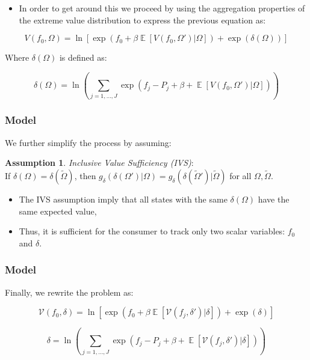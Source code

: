 \documentclass{beamer}
\theoremstyle{definition}
\newtheorem{assump}{Assumption}
\begin{document}
\begin{frame}
  \begin{itemize}
    \item In order to get around this we proceed by using the aggregation
      properties of the extreme value distribution to express the previous
      equation as:
  \end{itemize}

  \[
    V(f_0, \Omega) = \ln [ \exp (f_0 + \beta
    \mathop{\mathbb{E}}[V(f_0, \Omega')|\Omega]) +
    \exp(\delta(\Omega))]
  \]

  Where $\delta(\Omega)$ is defined as:

  \[
    \delta(\Omega) = \ln \left( \sum_{j = 1, \ldots, J} \exp (f_j - P_j + \beta +
      \mathop{\mathbb{E}}[V(f_0, \Omega')|\Omega])\right)
  \]
\end{frame}

\begin{frame}
  \frametitle{Model}
  
  We further simplify the process by assuming:

  \begin{assump}
    \textit{Inclusive Value Sufficiency (IVS)}: \\ If $\delta(\Omega) =
    \delta(\tilde \Omega)$, then $g_{\delta}(\delta(\Omega')|\Omega) =
    g_{\delta}(\delta(\tilde \Omega')| \tilde \Omega)$ for all $\Omega, \tilde
    \Omega$.
  \end{assump}

  \begin{itemize}
    \item The IVS assumption imply that all states with the same
      $\delta(\Omega)$ have the same expected value,
    \item Thus, it is sufficient for the consumer to track only two scalar
      variables: $f_0$ and $\delta$.
  \end{itemize}

\end{frame}

\begin{frame}
  \frametitle{Model}

  Finally, we rewrite the problem as:

  \[
    \mathcal{V}(f_0, \delta) = \ln [ \exp (f_0 + \beta
    \mathop{\mathbb{E}}[\mathcal{V}(f_j, \delta')|\delta]) +
    \exp(\delta)]
  \]

  \[
    \delta = \ln \left( \sum_{j = 1, \ldots, J} \exp (f_j - P_j + \beta +
      \mathop{\mathbb{E}}[\mathcal{V}(f_j, \delta')|\delta])\right)
  \]

\end{frame}
\end{document}
